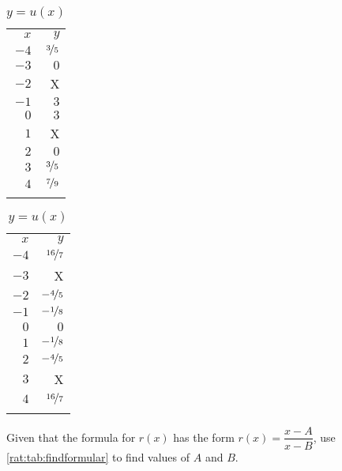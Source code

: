 \begin{exercises}
\begin{problem}
\begin{table}[!htb]
\begin{widepage}
\begin{subtable}{.2\textwidth}
 		\centering
 		\caption{$y=t(x)$}
 		\label{rat:tab:findformulat}
 		\begin{tabular}{rr}
 			\beforeheading
 			$x$  & $y$               \\ \afterheading
 			$-4$ & $\nicefrac{3}{5}$ \\\normalline
 			$-3$ & $0$               \\\normalline
 			$-2$ & X                 \\\normalline
 			$-1$ & $3$               \\\normalline
 			$0$  & $3$               \\\normalline
 			$1$  & X                 \\\normalline
 			$2$  & $0$               \\\normalline
 			$3$  & $\nicefrac{3}{5}$ \\\normalline
 			$4$  & $\nicefrac{7}{9}$ \\\lastline
 		\end{tabular}
 	\end{subtable}
 	\hfill
 	\begin{subtable}{.2\textwidth}
 		\centering
 		\caption{$y=u(x)$}
 		\label{rat:tab:findformulau}
 		\begin{tabular}{rr}
 			\beforeheading
 			$x$  & $y$                \\ \afterheading
 			$-4$ & $\nicefrac{16}{7}$ \\\normalline
 			$-3$ & X                  \\\normalline
 			$-2$ & $-\nicefrac{4}{5}$ \\\normalline
 			$-1$ & $-\nicefrac{1}{8}$ \\\normalline
 			$0$  & $0$                \\\normalline
 			$1$  & $-\nicefrac{1}{8}$ \\\normalline
 			$2$  & $-\nicefrac{4}{5}$ \\\normalline
 			$3$  & X                  \\\normalline
 			$4$  & $\nicefrac{16}{7}$ \\\lastline
 		\end{tabular}
 	\end{subtable}
 	\end{widepage}
 \end{table}
 \begin{subproblem}
 	Given that the formula for $r(x)$ has the form $r(x)=\dfrac{x-A}{x-B}$, use \cref{rat:tab:findformular}
 	to find values of $A$ and $B$.
 	\begin{shortsolution}

\end{shortsolution}
\end{subproblem}
\end{problem}
\end{exercises}
